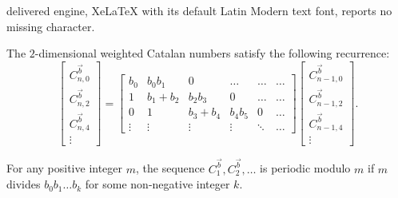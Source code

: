 \documentclass[10pt,a4paper]{amsart}
\begin{document}
delivered engine, XeLaTeX with its default Latin Modern text font, reports no missing character.
\begin{lemma} The $2$-dimensional weighted Catalan numbers satisfy the following recurrence:
\label{lemma:transmatrixcat}
 \[\begin{bmatrix}
C^{\vec{b}}_{n,0} \\
C^{\vec{b}}_{n,2} \\
C^{\vec{b}}_{n,4} \\
\vdots
\end{bmatrix} = 
\begin{bmatrix}
b_0 & b_0 b_1 & 0 & \dots  &\dots &\dots \\
1 & b_1 + b_2 & b_2 b_3 & 0 & \dots &\dots \\
0 & 1 & b_3 + b_4 & b_4 b_5 & 0 & \dots \\
\vdots & \vdots & \vdots & \vdots & \ddots &\dots
\end{bmatrix}
\begin{bmatrix}
C^{\vec{b}}_{n-1,0} \\
C^{\vec{b}}_{n-1,2} \\
C^{\vec{b}}_{n-1,4} \\
\vdots
\end{bmatrix}.
\] 
\end{lemma}

\begin{theorem}
    \label{theorem:general-periodicity}
    For any positive integer $m$, the sequence $C^{\vec{b}}_{1}, C^{\vec{b}}_2, \dots$ is periodic modulo $m$ if $m$ divides $b_0b_1\ldots b_k$ for some non-negative integer $k$. 
\end{theorem}
\end{document}
